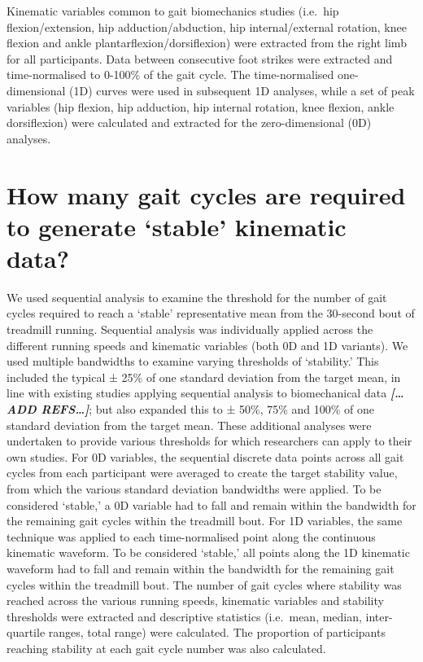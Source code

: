 \documentclass[]{elsarticle} %
\begin{document}
Kinematic variables common to gait biomechanics studies (i.e.~hip
flexion/extension, hip adduction/abduction, hip internal/external
rotation, knee flexion and ankle plantarflexion/dorsiflexion) were
extracted from the right limb for all participants. Data between
consecutive foot strikes were extracted and time-normalised to 0-100\%
of the gait cycle. The time-normalised one-dimensional (1D) curves were
used in subsequent 1D analyses, while a set of peak variables (hip
flexion, hip adduction, hip internal rotation, knee flexion, ankle
dorsiflexion) were calculated and extracted for the zero-dimensional
(0D) analyses.

\hypertarget{how-many-gait-cycles-are-required-to-generate-stable-kinematic-data}{%
\section{How many gait cycles are required to generate `stable'
kinematic
data?}\label{how-many-gait-cycles-are-required-to-generate-stable-kinematic-data}}

We used sequential analysis to examine the threshold for the number of
gait cycles required to reach a `stable' representative mean from the
30-second bout of treadmill running. Sequential analysis was
individually applied across the different running speeds and kinematic
variables (both 0D and 1D variants). We used multiple bandwidths to
examine varying thresholds of `stability.' This included the typical ±
25\% of one standard deviation from the target mean, in line with
existing studies applying sequential analysis to biomechanical data
\textbf{\emph{{[}\ldots ADD REFS\ldots{]}}}; but also expanded this to ±
50\%, 75\% and 100\% of one standard deviation from the target mean.
These additional analyses were undertaken to provide various thresholds
for which researchers can apply to their own studies. For 0D variables,
the sequential discrete data points across all gait cycles from each
participant were averaged to create the target stability value, from
which the various standard deviation bandwidths were applied. To be
considered `stable,' a 0D variable had to fall and remain within the
bandwidth for the remaining gait cycles within the treadmill bout. For
1D variables, the same technique was applied to each time-normalised
point along the continuous kinematic waveform. To be considered
`stable,' all points along the 1D kinematic waveform had to fall and
remain within the bandwidth for the remaining gait cycles within the
treadmill bout. The number of gait cycles where stability was reached
across the various running speeds, kinematic variables and stability
thresholds were extracted and descriptive statistics (i.e.~mean, median,
inter-quartile ranges, total range) were calculated. The proportion of
participants reaching stability at each gait cycle number was also
calculated.
\end{document}

